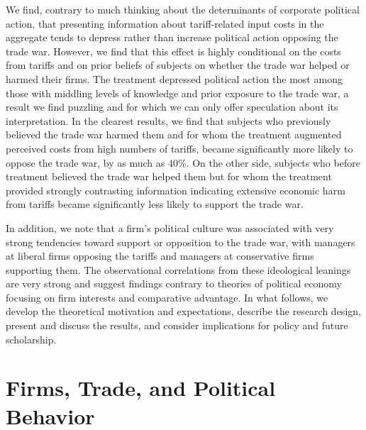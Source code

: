 \documentclass{article}
\begin{document}
We find, contrary to much thinking about the determinants of corporate political action, that presenting information about tariff-related input costs in the aggregate tends to depress rather than increase political action opposing the trade war. However, we find that this effect is highly conditional on the costs from tariffs and on prior beliefs of subjects on whether the trade war helped or harmed their firms. The treatment depressed political action the most among those with middling levels of knowledge and prior exposure to the trade war, a result we find puzzling and for which we can only offer speculation about its interpretation. In the clearest results, we find that subjects who previously believed the trade war harmed them and for whom the treatment augmented perceived costs from high numbers of tariffs, became significantly more likely to oppose the trade war, by as much as 40\%. On the other side, subjects who before treatment believed the trade war helped them but for whom the treatment provided strongly contrasting information indicating extensive economic harm from tariffs became significantly less likely to support the trade war.

In addition, we note that a firm's political culture was associated with very strong tendencies toward support or opposition to the trade war, with managers at liberal firms opposing the tariffs and managers at conservative firms supporting them. The observational correlations from these ideological leanings are very strong and suggest findings contrary to theories of political economy focusing on firm interests and comparative advantage. In what follows, we develop the theoretical motivation and expectations, describe the research design, present and discuss the results, and consider implications for policy and future scholarship.




\section{Firms, Trade, and Political Behavior}
\end{document}
